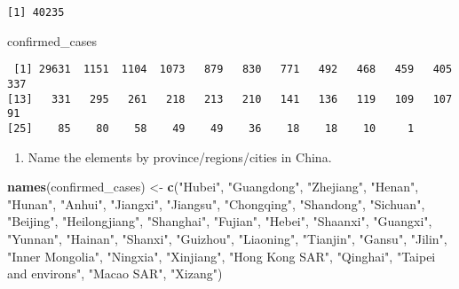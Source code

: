 \documentclass[]{article}
\newenvironment{Shaded}{\begin{snugshade}}{\end{snugshade}}
\newcommand{\KeywordTok}[1]{\textcolor[rgb]{0.13,0.29,0.53}{\textbf{#1}}}
\newcommand{\NormalTok}[1]{#1}
\newcommand{\StringTok}[1]{\textcolor[rgb]{0.31,0.60,0.02}{#1}}
\providecommand{\tightlist}{%
  \setlength{\itemsep}{0pt}\setlength{\parskip}{0pt}}
\begin{document}
\begin{verbatim}
[1] 40235
\end{verbatim}

\begin{Shaded}
\begin{Highlighting}[]
\NormalTok{confirmed_cases}
\end{Highlighting}
\end{Shaded}

\begin{verbatim}
 [1] 29631  1151  1104  1073   879   830   771   492   468   459   405   337
[13]   331   295   261   218   213   210   141   136   119   109   107    91
[25]    85    80    58    49    49    36    18    18    10     1
\end{verbatim}

\begin{enumerate}
\def\labelenumi{\roman{enumi})}
\setcounter{enumi}{1}
\tightlist
\item
  Name the elements by province/regions/cities in China.
\end{enumerate}

\begin{Shaded}
\begin{Highlighting}[]
\KeywordTok{names}\NormalTok{(confirmed_cases) <-}\StringTok{ }\KeywordTok{c}\NormalTok{(}\StringTok{"Hubei"}\NormalTok{, }\StringTok{"Guangdong"}\NormalTok{, }\StringTok{"Zhejiang"}\NormalTok{, }\StringTok{"Henan"}\NormalTok{, }\StringTok{"Hunan"}\NormalTok{, }\StringTok{"Anhui"}\NormalTok{,}
                            \StringTok{"Jiangxi"}\NormalTok{, }\StringTok{"Jiangsu"}\NormalTok{, }\StringTok{"Chongqing"}\NormalTok{, }\StringTok{"Shandong"}\NormalTok{, }\StringTok{"Sichuan"}\NormalTok{,}
                            \StringTok{"Beijing"}\NormalTok{, }\StringTok{"Heilongjiang"}\NormalTok{, }\StringTok{"Shanghai"}\NormalTok{, }\StringTok{"Fujian"}\NormalTok{, }\StringTok{"Hebei"}\NormalTok{, }
                            \StringTok{"Shaanxi"}\NormalTok{, }\StringTok{"Guangxi"}\NormalTok{, }\StringTok{"Yunnan"}\NormalTok{, }\StringTok{"Hainan"}\NormalTok{, }\StringTok{"Shanxi"}\NormalTok{, }
                            \StringTok{"Guizhou"}\NormalTok{, }\StringTok{"Liaoning"}\NormalTok{, }\StringTok{"Tianjin"}\NormalTok{, }\StringTok{"Gansu"}\NormalTok{, }\StringTok{"Jilin"}\NormalTok{, }
                            \StringTok{"Inner Mongolia"}\NormalTok{, }\StringTok{"Ningxia"}\NormalTok{,}
                            \StringTok{"Xinjiang"}\NormalTok{, }\StringTok{"Hong Kong SAR"}\NormalTok{, }\StringTok{"Qinghai"}\NormalTok{, }
                            \StringTok{"Taipei and environs"}\NormalTok{, }
                            \StringTok{"Macao SAR"}\NormalTok{, }\StringTok{"Xizang"}\NormalTok{)}
\end{Highlighting}
\end{Shaded}
\end{document}
